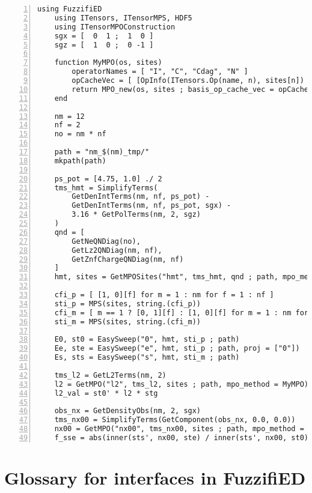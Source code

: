 \documentclass{timesjhep}
\begin{document}
\begin{lstlisting}[numbers=left]
    using FuzzifiED
    using ITensors, ITensorMPS, HDF5
    using ITensorMPOConstruction
    sgx = [  0  1 ;  1  0 ]
    sgz = [  1  0 ;  0 -1 ]

    function MyMPO(os, sites)
        operatorNames = [ "I", "C", "Cdag", "N" ]
        opCacheVec = [ [OpInfo(ITensors.Op(name, n), sites[n]) for name in operatorNames] for n in eachindex(sites)  ]
        return MPO_new(os, sites ; basis_op_cache_vec = opCacheVec)
    end

    nm = 12
    nf = 2
    no = nm * nf

    path = "nm_$(nm)_tmp/"
    mkpath(path)

    ps_pot = [4.75, 1.0] ./ 2
    tms_hmt = SimplifyTerms(
        GetDenIntTerms(nm, nf, ps_pot) -
        GetDenIntTerms(nm, nf, ps_pot, sgx) -
        3.16 * GetPolTerms(nm, 2, sgz)
    )
    qnd = [
        GetNeQNDiag(no),
        GetLz2QNDiag(nm, nf),
        GetZnfChargeQNDiag(nm, nf)
    ]
    hmt, sites = GetMPOSites("hmt", tms_hmt, qnd ; path, mpo_method = MyMPO)

    cfi_p = [ [1, 0][f] for m = 1 : nm for f = 1 : nf ]
    sti_p = MPS(sites, string.(cfi_p))
    cfi_m = [ m == 1 ? [0, 1][f] : [1, 0][f] for m = 1 : nm for f = 1 : nf ]
    sti_m = MPS(sites, string.(cfi_m))

    E0, st0 = EasySweep("0", hmt, sti_p ; path)
    Ee, ste = EasySweep("e", hmt, sti_p ; path, proj = ["0"])
    Es, sts = EasySweep("s", hmt, sti_m ; path)

    tms_l2 = GetL2Terms(nm, 2)
    l2 = GetMPO("l2", tms_l2, sites ; path, mpo_method = MyMPO)
    l2_val = st0' * l2 * stg

    obs_nx = GetDensityObs(nm, 2, sgx)
    tms_nx00 = SimplifyTerms(GetComponent(obs_nx, 0.0, 0.0))
    nx00 = GetMPO("nx00", tms_nx00, sites ; path, mpo_method = MyMPO)
    f_sse = abs(inner(sts', nx00, ste) / inner(sts', nx00, st0))
\end{lstlisting}

\section{Glossary for interfaces in FuzzifiED}
\label{app:glossary}
\end{document}
